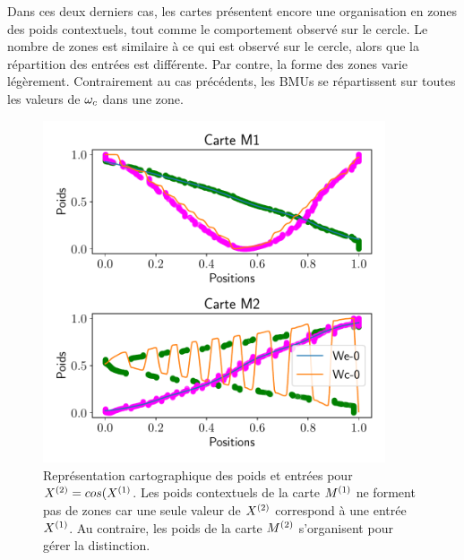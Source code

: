 \documentclass[../main]{subfiles}
\begin{document}
Dans ces deux derniers cas, les cartes présentent encore une organisation en zones des poids contextuels, tout comme le comportement observé sur le cercle. 
Le nombre de zones est similaire à ce qui est observé sur le cercle, alors que la répartition des entrées est différente. Par contre, la forme des zones varie légèrement.
Contrairement au cas précédents, les BMUs se répartissent sur toutes les valeurs de $\omega_c$ dans une zone.	
	\begin{figure}[H]
		\centering\includegraphics[width=0.9\textwidth]{2som_cos_w.pdf}
		\vspace{-0.5cm}
		\caption{Représentation cartographique des poids et entrées pour $X^{({2})} = cos(X^{({1})}$. Les poids contextuels de la carte $M^{({1})}$ ne forment pas de zones car une seule valeur de $X^{({2})}$ correspond à une entrée $X^{({1})}$. Au contraire, les poids de la carte $M^{({2})}$ s'organisent pour gérer la distinction. \label{fig:cos_results}}
	\end{figure}
	
\end{document}
